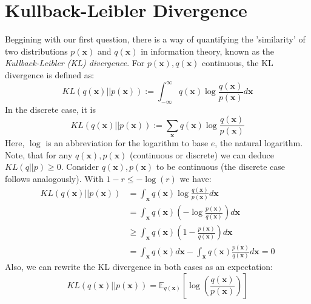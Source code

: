 \documentclass[12pt]{report}
\theoremstyle{definition}
\begin{document}
\section{Kullback-Leibler Divergence}
Beggining with our first question, there is a way of quantifying the 'similarity' of two distributions $p(\mathbf{x})$ and $q(\mathbf{x})$ in information theory, known as the \emph{Kullback-Leibler (KL) divergence}. For $p(\mathbf{x}), q(\mathbf{x})$ continuous, the KL divergence is defined as:
\begin{equation}
	KL(q(\mathbf{x})||p(\mathbf{x})) := \int_{-\infty}^{\infty} q(\mathbf{x}) \log \frac{q(\mathbf{x})}{p(\mathbf{x})} d \mathbf{x}
\end{equation}
In the discrete case, it is
\begin{equation}
	KL(q(\mathbf{x})||p(\mathbf{x})) := \sum_{\mathbf{x}} q(\mathbf{x}) \log \frac{q(\mathbf{x})}{p(\mathbf{x})}
\end{equation}
Here, $\log$ is an abbreviation for the logarithm to base $e$, the natural logarithm. Note, that for any $q(\mathbf{x}), p(\mathbf{x})$ (continuous or discrete) we can deduce $KL(q||p) \geq 0$.
Consider $q(\mathbf{x}), p(\mathbf{x})$ to be continuous (the discrete case follows analogously). With $1 - r \leq -\log(r)$ we have:
\begin{equation}
\begin{split}
KL(q(\mathbf{x})||p(\mathbf{x}))
& = \int_{\mathbf{x}} q(\mathbf{x}) \log \frac{q(\mathbf{x})}{p(\mathbf{x})} d \mathbf{x} \\
& = \int_{\mathbf{x}} q(\mathbf{x}) (- \log \frac{p(\mathbf{x})}{q(\mathbf{x})}) d \mathbf{x} \\
& \geq \int_{\mathbf{x}} q(\mathbf{x}) (1 - \frac{p(\mathbf{x})}{q(\mathbf{x})}) d \mathbf{x} \\
& = \int_{\mathbf{x}} q(\mathbf{x}) d \mathbf{x} - \int_{\mathbf{x}} q(\mathbf{x}) \frac{p(\mathbf{x})}{q(\mathbf{x})} d \mathbf{x} = 0
\end{split}
\end{equation}
Also, we can rewrite the KL divergence in both cases as an expectation:
\begin{equation}
	KL(q(\mathbf{x})||p(\mathbf{x})) = \mathbb{E}_{q(\mathbf{x})}\left[ \log\left(\frac{q(\mathbf{x})}{p(\mathbf{x})} \right) \right]
\end{equation}
\end{document}
